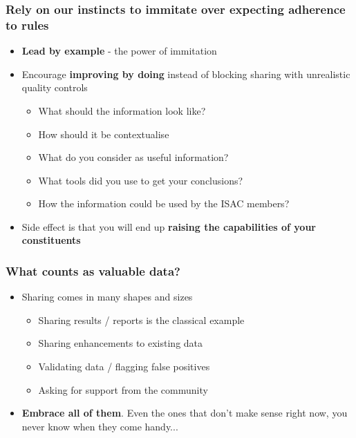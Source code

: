 \begin{frame}
\frametitle{Rely on our instincts to immitate over expecting adherence to rules}
\begin{itemize}
    \item {\bf Lead by example} - the power of immitation
    \item Encourage {\bf improving by doing} instead of blocking sharing with unrealistic quality controls
	\begin{itemize}
		\item What should the information look like?
		\item How should it be contextualise
		\item What do you consider as useful information?
		\item What tools did you use to get your conclusions?
        \item How the information could be used by the ISAC members?
	\end{itemize}
\item Side effect is that you will end up {\bf raising the capabilities of your constituents}
\end{itemize}
\end{frame}

\begin{frame}
\frametitle{What counts as valuable data?}
\begin{itemize}
	\item Sharing comes in many shapes and sizes
	\begin{itemize}
		\item Sharing results / reports is the classical example
		\item Sharing enhancements to existing data
		\item Validating data / flagging false positives
		\item Asking for support from the community
	\end{itemize}
\item {\bf Embrace all of them}. Even the ones that don't make sense right now, you never know when they come handy...
\end{itemize}
\end{frame}

